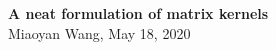 \documentclass[11pt]{article}
\theoremstyle{plain}
\theoremstyle{definition}
\newcommand{\Hnorm}[1]{\left\lVert#1\right\rVert_{\tH_\alpha}}
\begin{document}
\begin{center}
{\bf \Large A neat formulation of matrix kernels}\\
Miaoyan Wang, May 18, 2020\\
\end{center}

\vspace{.5cm}
\begin{comment}
\section{Model}
Key: Cartesian product of piecewise constant function representations. (has full generality...)

Let $\tY=\entry{y_{i_1,\ldots,i_K}}\in\{0,1\}^{d_1 \times \cdots \times d_K}$ be an order-$K$, $(d_1,\ldots,d_K)$-dimensional binary tensor. Let $\mxi^{(k)}=(\xi^{(k)}_1,\ldots,\xi^{(k)}_d)\in[0,1]^d$ be random vectors following (unknown) distributions $\mathbb{P}^{(k)}$ for all $k\in[K]$, and $\mxi^{(k)}$ and $\mxi^{(k')}$ are mutually independent for $k\neq k' \in[K]$. Assume that, conditional on $\{\mxi^{(k)}\}$, the entries of $\tY$ are independent sub-Gaussian distributed:
\[
\mathbb{E}\left(y_{i_1,\ldots,i_K}|\mxi \right)=f\left(\xi_{1,i_1},\ldots,\xi_{K,i_K}\right),\quad \text{for all } (i_1,\ldots,i_K)\in[d]\times \cdots \times [d],
\]
where $f\colon [0,1]^K\mapsto [0,1]$ is an unknown multivariate function belonging to a function class $f\in \tF_\alpha(L)$. Specifically, the function class is defined as
 \[ 
\tF_\alpha(L)=\{f\colon \text{Im}(f)\in[0,1]\ \text{and}\ \Hnorm{f}\leq L\},
\]
where $\alpha\in(0,1]$ is the smoothness parameter and $L>0$ is the H\"{o}lder norm bound for the functions in the class. 

Recall that the function H\"{o}lder norm $\Hnorm{f}$ is defined as
\[
\Hnorm{f}\stackrel{\text{def}}{=}\max_{|\omega|\leq \lfloor \alpha \rfloor}\sup_{\mx \in \tD} |\nabla_{\omega} f(\mx)|+\max_{|\omega| =\lfloor \alpha \rfloor}\sup_{\mx\neq \mx' \in \tD} {\nabla_{\omega} |f(\mx)-\nabla_{\omega} f(\mx')|\over \onenorm{\mx-\mx'}^{\alpha-\lfloor \alpha \rfloor}},
\]
where we have used the short-hand notion
\[
 \nabla_{\omega} f(\mx) ={\partial^{i_1+\cdots+i_K}\over \partial x^{i_1}_1\cdots \partial x^{i_K}_K} f(x_1,\ldots,x_k),
\]
for multi-indices $\omega=(i_1,\ldots,i_K)$ with $|\omega|=i_1+\cdots+i_K$, and $\mx=(x_1,\ldots,x_K)$ in the function domain. 



\end{comment}
\end{document}
